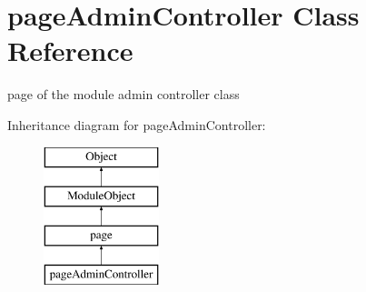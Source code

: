 \hypertarget{classpageAdminController}{\section{page\+Admin\+Controller Class Reference}
\label{classpageAdminController}
}


page of the module admin controller class  


Inheritance diagram for page\+Admin\+Controller\+:\begin{figure}[H]
\begin{center}
\leavevmode
\includegraphics[height=4.000000cm]{classpageAdminController}
\end{center}
\end{figure}
